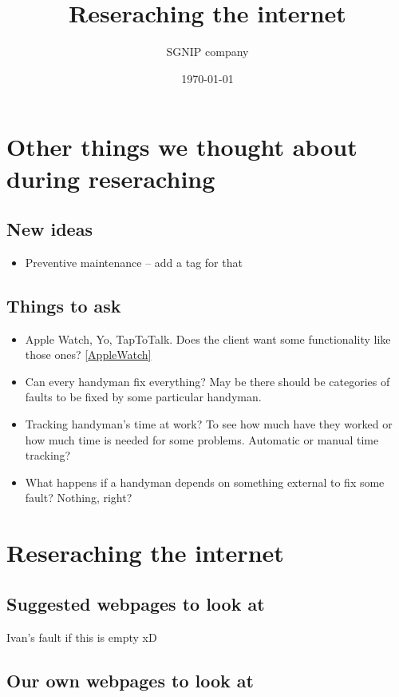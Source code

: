\documentclass{article}
\title{Reseraching the internet}
\date{\today}
\author{SGNIP company}
\begin{document}
\maketitle

\pagestyle{plain}

\newpage
\chapter{Other things we thought about during reseraching}

\section{New ideas}
\begin{itemize}
\item Preventive maintenance – add a tag for that
\end{itemize}

\section{Things to ask}

\begin{itemize}
\item Apple Watch, Yo, TapToTalk. Does the client want some functionality like those ones? \ref{AppleWatch}

\item Can every handyman fix everything? May be there should be categories of faults to be fixed by some particular handyman.
\item Tracking handyman's time at work? To see how much have they worked or how much time is needed for some problems. Automatic or manual time tracking?
\item What happens if a handyman depends on something external to fix some fault? Nothing, right?
\end{itemize}

\chapter{Reseraching the internet}

\section{Suggested webpages to look at}

Ivan's fault if this is empty xD

\section{Our own webpages to look at}
\end{document}
